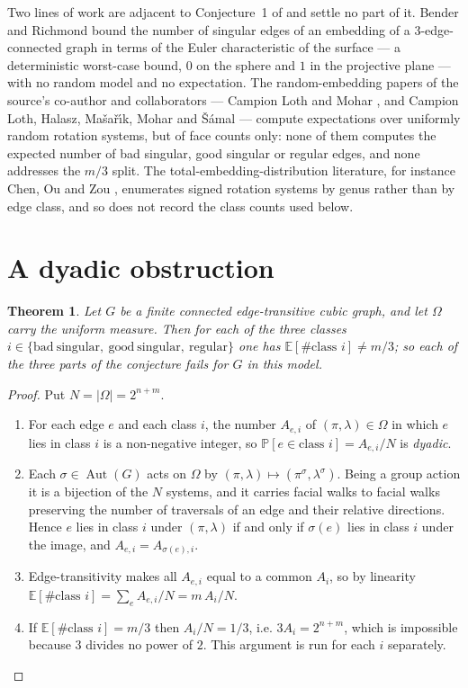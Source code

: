 \documentclass[11pt]{amsart}
\newtheorem{theorem}{Theorem}
\DeclareMathOperator{\Aut}{Aut}
\begin{document}
Two lines of work are adjacent to Conjecture~1 of \cite{GS} and settle no part
of it. Bender and Richmond \cite{BR} bound the number of singular edges of an
embedding of a $3$-edge-connected graph in terms of the Euler characteristic of
the surface --- a deterministic worst-case bound, $0$ on the sphere and $1$ in
the projective plane --- with no random model and no expectation. The
random-embedding papers of the source's co-author and collaborators --- Campion
Loth and Mohar \cite{CLM}, and Campion Loth, Halasz, Ma\v{s}a\v{r}\'{\i}k,
Mohar and \v{S}\'{a}mal \cite{CLHMMSa,CLHMMSb} --- compute expectations over
uniformly random rotation systems, but of face counts only: none of them
computes the expected number of bad singular, good singular or regular edges,
and none addresses the $m/3$ split. The total-embedding-distribution literature,
for instance Chen, Ou and Zou \cite{COZ}, enumerates signed rotation systems by
genus rather than by edge class, and so does not record the class counts used
below.

\section{A dyadic obstruction}

\begin{theorem}\label{thm:dyadic}
Let $G$ be a finite connected edge-transitive cubic graph, and let $\Omega$
carry the uniform measure. Then for each of the three classes
$i\in\{\mathrm{bad\ singular},\ \mathrm{good\ singular},\ \mathrm{regular}\}$
one has $\mathbb{E}[\#\text{class }i]\neq m/3$; so each of the three parts of
the conjecture fails for $G$ in this model.
\end{theorem}

\begin{proof}
Put $N=|\Omega|=2^{n+m}$.
\begin{enumerate}
\item For each edge $e$ and each class $i$, the number $A_{e,i}$ of
$(\pi,\lambda)\in\Omega$ in which $e$ lies in class $i$ is a non-negative
integer, so $\mathbb{P}[e\in\text{class }i]=A_{e,i}/N$ is \emph{dyadic}.
\item Each $\sigma\in\Aut(G)$ acts on $\Omega$ by
$(\pi,\lambda)\mapsto(\pi^{\sigma},\lambda^{\sigma})$. Being a group action it
is a bijection of the $N$ systems, and it carries facial walks to facial walks
preserving the number of traversals of an edge and their relative directions.
Hence $e$ lies in class $i$ under $(\pi,\lambda)$ if and only if $\sigma(e)$
lies in class $i$ under the image, and $A_{e,i}=A_{\sigma(e),i}$.
\item Edge-transitivity makes all $A_{e,i}$ equal to a common $A_i$, so by
linearity $\mathbb{E}[\#\text{class }i]=\sum_{e}A_{e,i}/N=m\,A_i/N$.
\item If $\mathbb{E}[\#\text{class }i]=m/3$ then $A_i/N=1/3$, i.e.
$3A_i=2^{n+m}$, which is impossible because $3$ divides no power of $2$. This
argument is run for each $i$ separately.\qedhere
\end{enumerate}
\end{proof}
\end{document}
